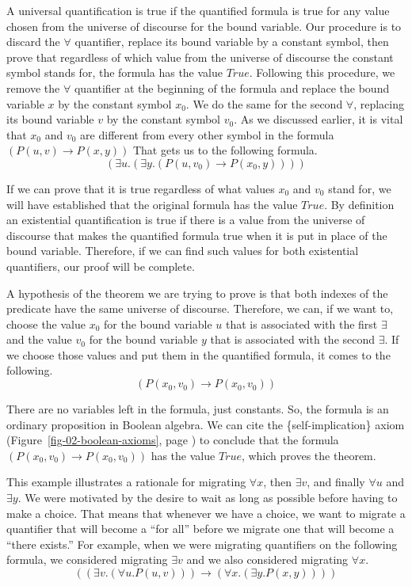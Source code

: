 {A universal quantification is true if
the quantified formula is true for any value
chosen from the universe of discourse for the bound variable.
Our procedure is to discard the $\forall$ quantifier,
replace its bound variable by a constant symbol, then
prove that regardless of which value from the universe of discourse
the constant symbol stands for, the formula has the value $True$.
Following this procedure, we remove the $\forall$ quantifier
at the beginning of the formula and replace the bound variable $x$
by the constant symbol $x_0$.
We do the same for the second $\forall$, replacing its bound variable
$v$ by the constant symbol $v_0$.
As we discussed earlier, it is vital that $x_0$ and $v_0$ are different
from every other symbol in the formula $(P(u, v) \rightarrow P(x, y))$
That gets us to the following formula.
$$(\exists u.(\exists y.(P(u, v_0) \rightarrow P(x_0, y))))$$

If we can prove that it is true regardless of what values
$x_0$ and $v_0$ stand for, we will have established that the
original formula has the value $True$.
By definition an existential quantification is true if
there is a value from the universe of discourse that
makes the quantified formula true when it is put in place of
the bound variable.
Therefore, if we can find such values for both existential
quantifiers, our proof will be complete.

A hypothesis of the theorem we are trying to prove
is that both indexes of the predicate have the same universe of discourse.
Therefore, we can, if we want to,
choose the value $x_0$ for the bound variable $u$
that is associated with the first $\exists$
and the value $v_0$ for the bound variable $y$
that is associated with the second $\exists$.
If we choose those values and put them in the
quantified formula, it comes to the following.
$$(P(x_0, v_0) \rightarrow P(x_0, v_0))$$

There are no variables left in the formula, just constants.
So, the formula is an ordinary proposition in Boolean algebra.
We can cite the \{self-implication\} axiom
(Figure~\ref{fig-02-boolean-axioms}, page \pageref{fig-02-boolean-axioms})
to conclude that the formula $(P(x_0, v_0) \rightarrow P(x_0, v_0))$
has the value $True$, which proves the theorem.

This example illustrates a rationale for migrating
$\forall x$, then $\exists v$, and finally $\forall u$ and $\exists y$.
We were motivated by the desire to wait as long as possible before having to make
a choice. That means that whenever we have a choice, we want to migrate a quantifier
that will become a ``for all'' before we migrate one that will become a ``there exists.''
For example, when we were migrating quantifiers on the following formula, we considered
migrating $\exists v$ and we also considered migrating $\forall x$.
$$((\exists v.(\forall u.P(u, v))) \rightarrow (\forall x.(\exists y.P(x, y))))$$

}
